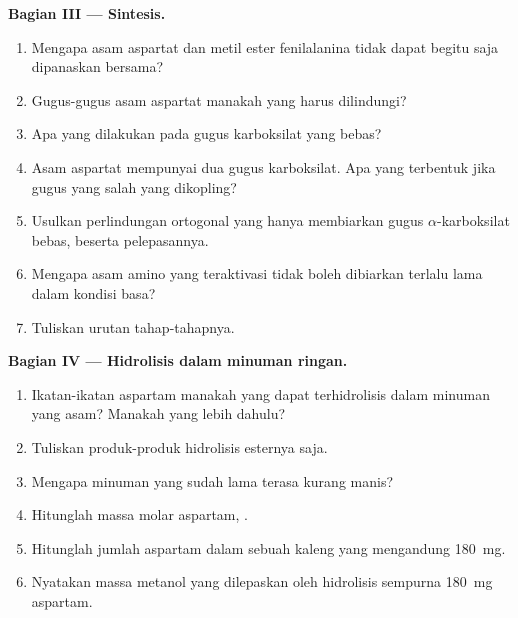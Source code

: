 \begin{problem}
\medskip
\noindent\textbf{Bagian III --- Sintesis.}
\begin{enumerate}[resume]
  \item Mengapa asam aspartat dan metil ester fenilalanina tidak dapat begitu saja dipanaskan bersama?
  \item Gugus-gugus asam aspartat manakah yang harus dilindungi?
  \item Apa yang dilakukan  pada gugus karboksilat yang bebas?
  \item Asam aspartat mempunyai dua gugus karboksilat. Apa yang terbentuk
        jika gugus yang salah yang dikopling?
  \item Usulkan perlindungan ortogonal yang hanya membiarkan gugus
        $\alpha$-karboksilat bebas, beserta pelepasannya.
  \item Mengapa asam amino yang teraktivasi tidak boleh dibiarkan terlalu
        lama dalam kondisi basa?
  \item Tuliskan urutan tahap-tahapnya.
\end{enumerate}

\medskip
\noindent\textbf{Bagian IV --- Hidrolisis dalam minuman ringan.}
\begin{enumerate}[resume]
  \item Ikatan-ikatan aspartam manakah yang dapat terhidrolisis dalam minuman
        yang asam? Manakah yang lebih dahulu?
  \item Tuliskan produk-produk hidrolisis esternya saja.
  \item Mengapa minuman yang sudah lama terasa kurang manis?
  \item Hitunglah massa molar aspartam, .
  \item Hitunglah jumlah aspartam dalam sebuah kaleng yang mengandung \qty{180}{mg}.
  \item Nyatakan massa metanol yang dilepaskan oleh hidrolisis sempurna
        \qty{180}{mg} aspartam.
\end{enumerate}
\end{problem}
